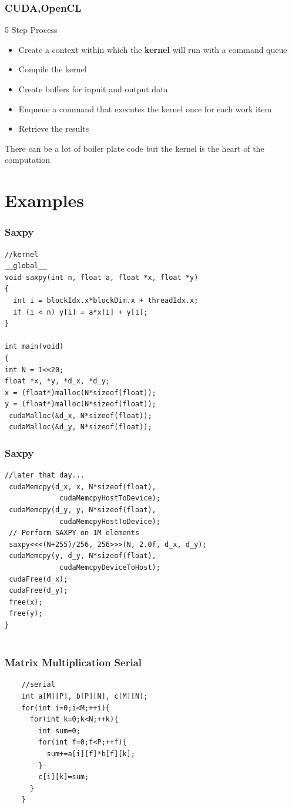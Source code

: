 \documentclass{beamer}
\begin{document}
\begin{frame}
	\frametitle{CUDA,OpenCL}
	5 Step Process
	\begin{itemize}
		\item Create a context within which the \textbf{kernel} will run with a command queue
		\item Compile the kernel
		\item Create buffers for inpuit and output data
		\item Enqueue a command that executes the kernel once for each work item
		\item Retrieve the results
	\end{itemize}
	There can be a lot of boiler plate code but the kernel is the heart of the computation
\end{frame}


\section{Examples}
 \begin{frame}[fragile=singleslide]
 	\frametitle{Saxpy}
\begin{lstlisting}
//kernel
__global__
void saxpy(int n, float a, float *x, float *y)
{
  int i = blockIdx.x*blockDim.x + threadIdx.x;
  if (i < n) y[i] = a*x[i] + y[i];
}

int main(void)
{
int N = 1<<20;
float *x, *y, *d_x, *d_y;
x = (float*)malloc(N*sizeof(float));
y = (float*)malloc(N*sizeof(float));
 cudaMalloc(&d_x, N*sizeof(float)); 
 cudaMalloc(&d_y, N*sizeof(float));
 \end{lstlisting}
 \end{frame}
  
  \begin{frame}[fragile=singleslide]
  	\frametitle{Saxpy}
  	\begin{lstlisting}
//later that day...
 cudaMemcpy(d_x, x, N*sizeof(float),
             cudaMemcpyHostToDevice);
 cudaMemcpy(d_y, y, N*sizeof(float),
             cudaMemcpyHostToDevice);
 // Perform SAXPY on 1M elements
 saxpy<<<(N+255)/256, 256>>>(N, 2.0f, d_x, d_y);
 cudaMemcpy(y, d_y, N*sizeof(float), 
             cudaMemcpyDeviceToHost);
 cudaFree(d_x);
 cudaFree(d_y);
 free(x);
 free(y);
}
  	
  	\end{lstlisting}
  \end{frame}


  \begin{frame}[fragile=singleslide]
  	\frametitle{Matrix Multiplication Serial}
  	\begin{lstlisting}
  	//serial
    int a[M][P], b[P][N], c[M][N];
  	for(int i=0;i<M;++i){
  	  for(int k=0;k<N;++k){
  	    int sum=0;
  	    for(int f=0;f<P;++f){
  	      sum+=a[i][f]*b[f][k];
  	    }
  	    c[i][k]=sum;
  	  }
  	}
  	
  	\end{lstlisting}
  \end{frame}
  
\end{document}
